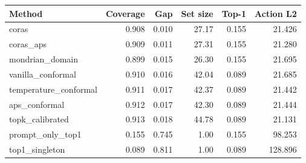 \begin{tabular}{lrrrrr}
\toprule
Method & Coverage & Gap & Set size & Top-1 & Action L2 \\
\midrule
coras & 0.908 & 0.010 & 27.17 & 0.155 & 21.426 \\
coras\_aps & 0.909 & 0.011 & 27.31 & 0.155 & 21.280 \\
mondrian\_domain & 0.899 & 0.015 & 26.30 & 0.155 & 21.695 \\
vanilla\_conformal & 0.910 & 0.016 & 42.04 & 0.089 & 21.685 \\
temperature\_conformal & 0.911 & 0.017 & 42.37 & 0.089 & 21.442 \\
aps\_conformal & 0.912 & 0.017 & 42.30 & 0.089 & 21.444 \\
topk\_calibrated & 0.913 & 0.018 & 44.78 & 0.089 & 21.131 \\
prompt\_only\_top1 & 0.155 & 0.745 & 1.00 & 0.155 & 98.253 \\
top1\_singleton & 0.089 & 0.811 & 1.00 & 0.089 & 128.896 \\
\bottomrule
\end{tabular}